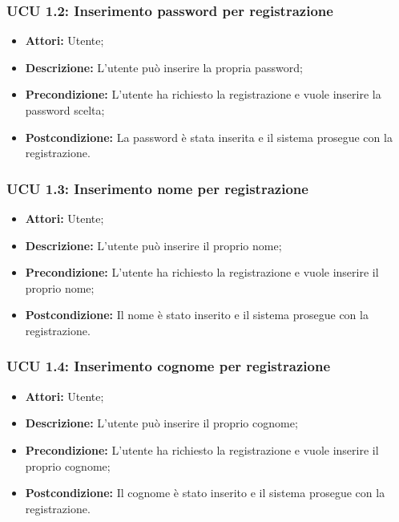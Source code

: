 \hypertarget{U1.2}{}
\subsubsection{UCU 1.2: Inserimento password per registrazione}
\begin{itemize}
	\item \textbf{Attori:} Utente;
	\item \textbf{Descrizione:} L'utente può inserire la propria password;
	\item \textbf{Precondizione:} L'utente ha richiesto la registrazione e vuole inserire la password scelta;
	\item \textbf{Postcondizione:} La password è stata inserita e il sistema prosegue con la registrazione.
\end{itemize}

\hypertarget{U1.3}{}
\subsubsection{UCU 1.3: Inserimento nome per registrazione}
\begin{itemize}
	\item \textbf{Attori:} Utente;
	\item \textbf{Descrizione:} L'utente può inserire il proprio nome;
	\item \textbf{Precondizione:} L'utente ha richiesto la registrazione e vuole inserire il proprio nome;
	\item \textbf{Postcondizione:} Il nome è stato inserito e il sistema prosegue con la registrazione.
\end{itemize}

\hypertarget{U1.4}{}
\subsubsection{UCU 1.4: Inserimento cognome per registrazione}
\begin{itemize}
	\item \textbf{Attori:} Utente;
	\item \textbf{Descrizione:} L'utente può inserire il proprio cognome;
	\item \textbf{Precondizione:} L'utente ha richiesto la registrazione e vuole inserire il proprio cognome;
	\item \textbf{Postcondizione:} Il cognome è stato inserito e il sistema prosegue con la registrazione.
\end{itemize}

